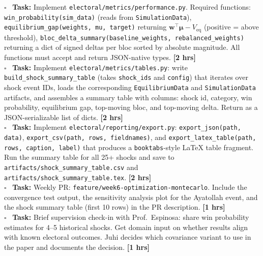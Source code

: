\documentclass[11pt]{article}
\newcommand{\hrs}[1]{\textbf{[#1 hrs]}}
\newcommand{\veq}{V_{\mathrm{eq}}}
\newcommand{\boldmu}{\boldsymbol{\mu}}
\newcommand{\task}[2]{%
  \noindent\textbf{Task:} #1 \hfill \hrs{#2}\\}
\newcommand{\done}{\textcolor{sectionblue}{$\square$}\ }
\begin{document}
\begin{taskbox}
\done \task{Implement \texttt{electoral/metrics/performance.py}. Required
  functions: \texttt{win\_probability(sim\_data)} (reads from
  \texttt{SimulationData}), \texttt{equilibrium\_gap(weights, mu, target)}
  returning $\mathbf{w}^\top\boldmu - \veq$ (positive = above threshold),
  \texttt{bloc\_delta\_summary(baseline\_weights, rebalanced\_weights)}
  returning a dict of signed deltas per bloc sorted by absolute magnitude.
  All functions must accept and return JSON-native types.}{2}

\done \task{Implement \texttt{electoral/metrics/tables.py}: write
  \texttt{build\_shock\_summary\_table} (takes \texttt{shock\_ids} and
  \texttt{config}) that iterates over shock event IDs, loads the
  corresponding \texttt{EquilibriumData} and \texttt{SimulationData}
  artifacts, and assembles a summary table with columns: shock id,
  category, win probability, equilibrium gap, top-moving bloc, and
  top-moving delta. Return as a JSON-serializable list of dicts.}{2}

\done \task{Implement \texttt{electoral/reporting/export.py}:
  \texttt{export\_json(path, data)}, \texttt{export\_csv(path, rows, fieldnames)},
  and \texttt{export\_latex\_table(path, rows, caption, label)} that produces
  a \texttt{booktabs}-style LaTeX table fragment. Run the summary table for
  all 25+ shocks and save to \texttt{artifacts/shock\_summary\_table.csv}
  and \texttt{artifacts/shock\_summary\_table.tex}.}{2}

\done \task{Weekly PR: \texttt{feature/week6-optimization-montecarlo}. Include
  the convergence test output, the sensitivity analysis plot for the Ayatollah
  event, and the shock summary table (first 10 rows) in the PR description.}{1}

\done \task{Brief supervision check-in with Prof.\ Espinosa: share win
  probability estimates for 4--5 historical shocks. Get domain input on
  whether results align with known electoral outcomes. Juhi decides which
  covariance variant to use in the paper and documents the decision.}{1}
\end{taskbox}
\end{document}
